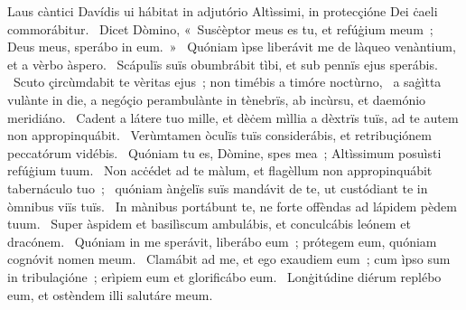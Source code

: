 { Laus càntici Davídis}
{%
ui hábitat in adjutório Altìssimi, in protecçióne Dei ċaeli commorábitur. 
~Dicet Dòmino, «~Susċèptor meus es tu, et refúġium meum~; Deus meus, sperábo in eum.~»
~Quóniam ìpse liberávit me de làqueo venàntium, et a vèrbo àspero. 
~Scápulïs suïs obumbrábit tìbi, et sub pennïs ejus sperábis. 
~Scuto çircùmdabit te vèritas ejus~; non timébis a timóre noctùrno, 
~a saġìtta vulànte in die, a negóçio perambulànte in tènebrïs, ab incùrsu, et daemónio meridiáno. 
~Cadent a látere tuo mille, et dèċem mìllia a dèxtrïs tuïs, ad te autem non appropinquábit. 
~Verùmtamen òculïs tuïs considerábis, et retribuçiónem peccatórum vidébis. 
~Quóniam tu es, Dòmine, spes mea~; Altìssimum posuìsti refúġium tuum. 
~Non acċédet ad te màlum, et flagèllum non appropinquábit tabernáculo tuo~; 
~quóniam ànġelïs suïs mandávit de te, ut custódiant te in òmnibus viïs tuïs. 
~In mànibus portábunt te, ne forte offèndas ad lápidem pèdem tuum. 
~Super àspidem et basilìscum ambulábis, et conculcábis leónem et dracónem. 
~Quóniam in me sperávit, liberábo eum~; prótegem eum, quóniam cognóvit nomen meum. 
~Clamábit ad me, et ego exaudiem eum~; cum ìpso sum in tribulaçióne~; erìpiem eum et glorificábo eum. 
~Lonġitúdine diérum replébo eum, et ostèndem illi salutáre meum. 
}

